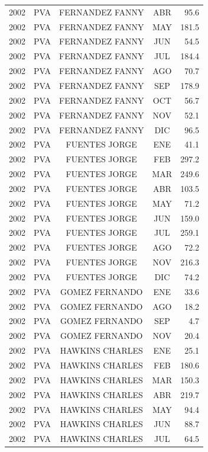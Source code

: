 \documentclass[12pt,]{article}
\begin{document}
\begin{table}[ht]
{\begin{tabular}{lcccr}
  2002 & PVA & FERNANDEZ FANNY & ABR & 95.6 \\ 
  2002 & PVA & FERNANDEZ FANNY & MAY & 181.5 \\ 
  2002 & PVA & FERNANDEZ FANNY & JUN & 54.5 \\ 
  2002 & PVA & FERNANDEZ FANNY & JUL & 184.4 \\ 
  2002 & PVA & FERNANDEZ FANNY & AGO & 70.7 \\ 
  2002 & PVA & FERNANDEZ FANNY & SEP & 178.9 \\ 
  2002 & PVA & FERNANDEZ FANNY & OCT & 56.7 \\ 
  2002 & PVA & FERNANDEZ FANNY & NOV & 52.1 \\ 
  2002 & PVA & FERNANDEZ FANNY & DIC & 96.5 \\ 
  2002 & PVA & FUENTES JORGE & ENE & 41.1 \\ 
  2002 & PVA & FUENTES JORGE & FEB & 297.2 \\ 
  2002 & PVA & FUENTES JORGE & MAR & 249.6 \\ 
  2002 & PVA & FUENTES JORGE & ABR & 103.5 \\ 
  2002 & PVA & FUENTES JORGE & MAY & 71.2 \\ 
  2002 & PVA & FUENTES JORGE & JUN & 159.0 \\ 
  2002 & PVA & FUENTES JORGE & JUL & 259.1 \\ 
  2002 & PVA & FUENTES JORGE & AGO & 72.2 \\ 
  2002 & PVA & FUENTES JORGE & NOV & 216.3 \\ 
  2002 & PVA & FUENTES JORGE & DIC & 74.2 \\ 
  2002 & PVA & GOMEZ FERNANDO & ENE & 33.6 \\ 
  2002 & PVA & GOMEZ FERNANDO & AGO & 18.2 \\ 
  2002 & PVA & GOMEZ FERNANDO & SEP & 4.7 \\ 
  2002 & PVA & GOMEZ FERNANDO & NOV & 20.4 \\ 
  2002 & PVA & HAWKINS CHARLES & ENE & 25.1 \\ 
  2002 & PVA & HAWKINS CHARLES & FEB & 180.6 \\ 
  2002 & PVA & HAWKINS CHARLES & MAR & 150.3 \\ 
  2002 & PVA & HAWKINS CHARLES & ABR & 219.7 \\ 
  2002 & PVA & HAWKINS CHARLES & MAY & 94.4 \\ 
  2002 & PVA & HAWKINS CHARLES & JUN & 88.7 \\ 
  2002 & PVA & HAWKINS CHARLES & JUL & 64.5 \\ 

\end{tabular}}
\end{table}
\end{document}
